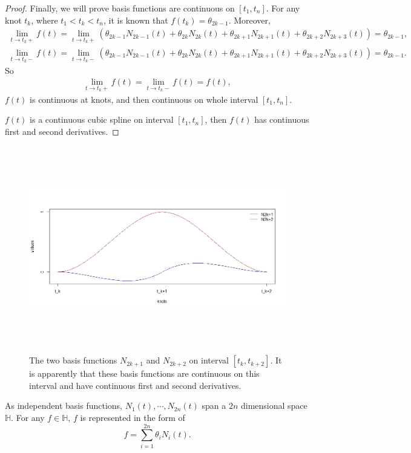 \begin{proof}
Finally, we will prove basis functions are continuous on $[t_1, t_n]$. For any knot $t_k$, where $t_1< t_k <t_n$, it is known that $f(t_k)=\theta_{2k-1}$. Moreover, 
\begin{align*}
\lim\limits_{t\rightarrow t_k+} f(t) = \lim\limits_{t\rightarrow t_k+} (\theta_{2k-1}N_{2k-1}(t)+\theta_{2k}N_{2k}(t)+\theta_{2k+1}N_{2k+1}(t)+\theta_{2k+2}N_{2k+3}(t))=\theta_{2k-1},\\
\lim\limits_{t\rightarrow t_k-} f(t) = \lim\limits_{t\rightarrow t_k-} (\theta_{2k-1}N_{2k-1}(t)+\theta_{2k}N_{2k}(t)+\theta_{2k+1}N_{2k+1}(t)+\theta_{2k+2}N_{2k+3}(t))=\theta_{2k-1}.
\end{align*}
So
\begin{align*}
\lim\limits_{t\rightarrow t_k+} f(t) =\lim\limits_{t\rightarrow t_k-} f(t) =f(t),
\end{align*}
$f(t)$ is continuous at knots, and then continuous on whole interval $[t_1,t_n]$.

$f(t)$ is a continuous cubic spline on interval $[t_1,t_n]$, then $f(t)$ has continuous first and second derivatives.
\end{proof}

\begin{figure}[t] \centering
\includegraphics[width=\textwidth, height=9cm]{n2i}
\small \caption{The two basis functions $N_{2k+1}$ and $N_{2k+2}$ on interval $[t_k, t_{k+2}]$. It is apparently that these basis functions are continuous on this interval and have continuous first and second derivatives.}
\end{figure}


As independent basis functions, $N_1(t), \cdots, N_{2n}(t)$ span a $2n$ dimensional space $\mathbb{H}$. For any $f \in \mathbb{H}$, $f$ is represented in the form of
\begin{equation*}
f=\sum_{i=1}^{2n} \theta_i N_i(t).
\end{equation*}

